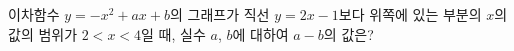 이차함수 $y=-x^2+ax+b$의 그래프가 직선 $y=2x-1$보다 위쪽에 있는 부분의 $x$의 값의 범위가 $2<x<4$일 때, 실수 $a$, $b$에 대하여 $a-b$의 값은?
